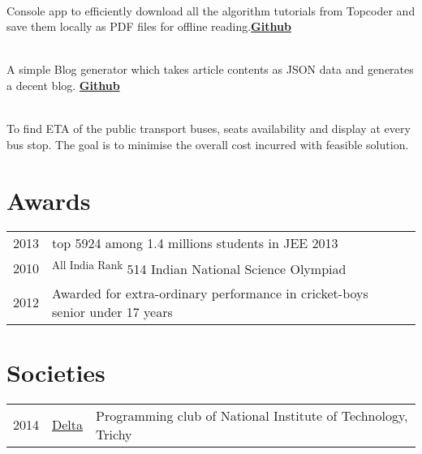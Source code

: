 \documentclass[]{deedy-resume-openfont}
\begin{document}
\begin{minipage}[t]{0.66\textwidth}
\\
Console app to efficiently download all the algorithm tutorials from Topcoder and save them locally as PDF files for offline reading.\textbf{\href{https://github.com/tushar-rishav/topcoder-dl}{Github}}
\sectionsep

\\
A simple Blog generator which takes article contents as JSON data and generates a decent blog.
\textbf{\href{https://github.com/tushar-rishav/Blogular}{Github}}
\sectionsep

\\
To find ETA of the public transport buses, seats availability and display at every bus stop. The goal is to minimise the overall cost incurred with feasible solution. 
\sectionsep


\section{Awards} 
\begin{tabular}{rll}
2013	     & top 5924 among 1.4 millions students in JEE 2013\\
2010	     & \textsuperscript{All India Rank} 514 Indian National Science Olympiad\\
2012     & Awarded for extra-ordinary performance in cricket-boys senior under 17 years\\
\end{tabular}
\sectionsep


\section{Societies} 

\begin{tabular}{rll}
2014   & {\href{https://github.com/delta}{Delta}} & Programming club of National Institute of Technology, Trichy\\
\end{tabular}
\sectionsep

\end{minipage} 
\end{document}
